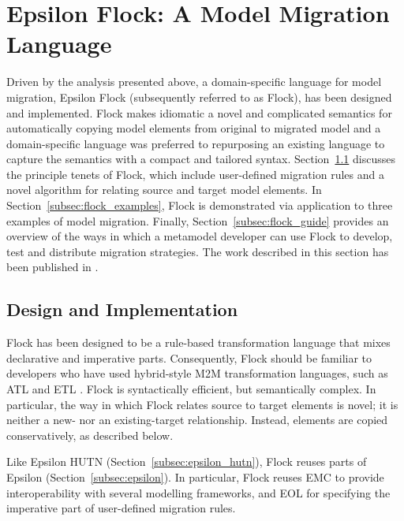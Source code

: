 
\section{Epsilon Flock: A Model Migration Language}
\label{sec:flock}
Driven by the analysis presented above, a domain-specific language for model migration, Epsilon Flock (subsequently referred to as Flock), has been designed and implemented. Flock makes idiomatic a novel and complicated semantics for automatically copying model elements from original to migrated model and a domain-specific language was preferred to repurposing an existing language to capture the semantics with a compact and tailored syntax. Section~\ref{subsec:flock_design} discusses the principle tenets of Flock, which include user-defined migration rules and a novel algorithm for relating source and target model elements. In Section~\ref{subsec:flock_examples}, Flock is demonstrated via application to three examples of model migration. Finally, Section~\ref{subsec:flock_guide} provides an overview of the ways in which a metamodel developer can use Flock to develop, test and distribute migration strategies. The work described in this section has been published in \cite{rose10flock}.

\subsection{Design and Implementation}
\label{subsec:flock_design}
Flock has been designed to be a rule-based transformation language that mixes declarative and imperative parts. Consequently, Flock should be familiar to developers who have used hybrid-style M2M transformation languages, such as ATL and ETL \cite{kolovos08etl}. Flock is syntactically efficient, but semantically complex. In particular, the way in which Flock relates source to target elements is novel; it is neither a new- nor an existing-target relationship. Instead, elements are copied conservatively, as described below.

Like Epsilon HUTN (Section~\ref{subsec:epsilon_hutn}), Flock reuses parts of Epsilon (Section~\ref{subsec:epsilon}). In particular, Flock reuses EMC to provide interoperability with several modelling frameworks, and EOL for specifying the imperative part of user-defined migration rules.

